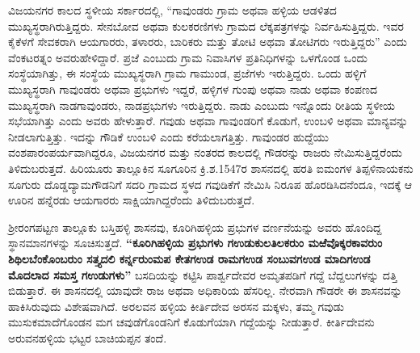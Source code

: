 ವಿಜಯನಗರ ಕಾಲದ ಸ್ಥಳೀಯ ಸರ್ಕಾರದಲ್ಲಿ, “ಗಾವುಂಡರು ಗ್ರಾಮ ಅಥವಾ ಹಳ್ಳಿಯ ಆಡಳಿತದ ಮುಖ್ಯಸ್ಥರಾಗಿರು\-ತ್ತಿದ್ದರು. ಸೇನಬೋವ ಅಥವಾ ಕುಲಕರಣಿಗಳು ಗ್ರಾಮದ ಲೆಕ್ಕಪತ್ರಗಳನ್ನು ನಿರ್ವಹಿಸುತ್ತಿದ್ದರು. ಇವರ ಕೈಕೆಳಗೆ ಸೇವಕರಾಗಿ ಆಯಗಾರರು, ತಳಾರರು, ಬಾರಿಕರು ಮತ್ತು ತೋಟಿ ಅಥವಾ ತೋಟಿಗರು ಇರುತ್ತಿದ್ದರು” ಎಂದು ವೆಂಕಟರತ್ನಂ ಅವರುಹೇಳಿದ್ದಾರೆ. ಪ್ರಜೆ ಎಂಬುದು ಗ್ರಾಮ ನಿವಾಸಿಗಳ ಪ್ರತಿನಿಧಿಗಳನ್ನು ಒಳಗೊಂಡ ಒಂದು ಸಂಸ್ಥೆಯಾಗಿತ್ತು, ಈ ಸಂಸ್ಥೆಯ ಮುಖ್ಯಸ್ಥರಾಗಿ ಗ್ರಾಮ ಗಾಮುಂಡ, ಪ್ರಜೆಗಳು ಇರುತ್ತಿದ್ದರು. ಒಂದು ಹಳ್ಳಿಗೆ ಮುಖ್ಯಸ್ಥರಾಗಿ ಗಾವುಂಡರು ಅಥವಾ ಪ್ರಭುಗಳು ಇದ್ದರೆ, ಹಳ್ಳಿಗಳ ಗುಂಪು ಅಥವಾ ನಾಡು ಅಥವಾ ಕಂಪಣದ ಮುಖ್ಯಸ್ಥರಾಗಿ ನಾಡಗಾವುಂಡರು, ನಾಡಪ್ರಭುಗಳು ಇರುತ್ತಿದ್ದರು. ನಾಡು ಎಂಬುದು ಇನ್ನೊಂದು ರೀತಿಯ ಸ್ಥಳೀಯ ಸಭೆಯಾಗಿತ್ತು ಎಂದು ಅವರು ಹೇಳುತ್ತಾರೆ. ಗವುಡು ಅಥವಾ ಗಾವುಂಡರಿಗೆ ಕೊಡುಗೆ, ಉಂಬಳಿ ಅಥವಾ ಮಾನ್ಯವನ್ನು ನೀಡಲಾಗುತ್ತಿತ್ತು. ಇದನ್ನು ಗೌಡಿಕೆ ಉಂಬಳಿ ಎಂದು ಕರೆಯಲಾಗತ್ತಿತ್ತು. ಗಾವುಂಡರ ಹುದ್ದೆಯು ವಂಶಪಾರಂಪರ್ಯವಾಗಿದ್ದರೂ, ವಿಜಯನಗರ ಮತ್ತು ನಂತರದ ಕಾಲದಲ್ಲಿ ಗೌಡರನ್ನು ರಾಜರು ನೇಮಿಸುತ್ತಿದ್ದರೆಂದು ತಿಳಿದುಬರುತ್ತದೆ. ಹಿರಿಯೂರು ತಾಲ್ಲೂಕಿನ ಸೂಗೂರಿನ ಕ್ರಿ.ಶ.1547ರ ಶಾಸನದಲ್ಲಿ ಹರತಿ ಐಮಂಗಳ ತಿಪ್ಪಳಿನಾಯಕನು ಸೂಗುರು ದೊಡ್ಡದ್ಯಾಮಗೌಡನಿಗೆ ಸದರಿ ಗ್ರಾಮದ ಸ್ಥಳದ ಗವುಡಿಕೆಗೆ ನೇಮಿಸಿ ನಿರೂಪ ಹೊರಡಿಸಿದನೆಂದೂ, ಇದಕ್ಕೆ ಆ ಊರಿನ ಹನ್ನೆರಡು ಆಯಗಾರರು ಸಾಕ್ಷಿಯಾಗಿದ್ದರೆಂದು ತಿಳಿದುಬರುತ್ತದೆ.

\newpage

ಶ‍್ರೀರಂಗಪಟ್ಟಣ ತಾಲ್ಲೂಕು ಬಸ್ತಿಹಳ್ಳಿ ಶಾಸನವು, ಕೂರಿಗಿಹಳ್ಳಿಯ ಪ್ರಭುಗಳ ವರ್ಣನೆಯನ್ನು ಅವರು ಹೊಂದಿದ್ದ ಸ್ಥಾನಮಾನ\-ಗಳನ್ನು ಸೂಚಿಸುತ್ತದೆ. \textbf{“ಕೂರಿಗಿಹಳ್ಳಿಯ ಪ್ರಭುಗಳು ಗಉಡುಕುಲತಿಲಕರುಂ ಮಱೆವೊಕ್ಕರಕಾವರುಂ ಶಿಥಿಲ\-ಬೆಂಕೊಂಬರುಂ ಸತ್ತ್ಯದಲಿ ಕರ್ನ್ನರುಂಮಪ ಕೇತಗಉಡ ರಾಮಗಉಡ ಸಂಬುವಗಉಡ ಮಾದಿಗಉಡ ಮೊದಲಾದ ಸಮಸ್ತ ಗಉಡುಗಳು”} ಬಸದಿಯನ್ನು ಕಟ್ಟಿಸಿ ಪಾರ್ಶ್ವದೇವರ ಅಮೃತಪಡಿಗೆ ಗದ್ದೆ ಬೆದ್ದಲುಗಳನ್ನು ದತ್ತಿ ಬಿಡುತ್ತಾರೆ. ಈ ಶಾಸನದಲ್ಲಿ ಯಾವುದೇ ರಾಜ ಅಥವಾ ಅಧಿಕಾರಿಯ ಹೆಸರಿಲ್ಲ. ನೇರವಾಗಿ ಗೌಡರೇ ಈ ಶಾಸನವನ್ನು ಹಾಕಿಸಿರುವುದು ವಿಶೇಷವಾಗಿದೆ. ಅರಲವನ ಹಳ್ಳಿಯ ಕೀರ್ತಿದೇವ ಅರಸನ ಮಕ್ಕಳು, ತಮ್ಮ ಗವುಡು ಮುಸುಕಮಾದೆಗೊಂಡನ ಮಗ ಚವುಡೆಗೊಂಡನಿಗೆ ಕೊಡುಗೆಯಾಗಿ ಗದ್ದೆಯನ್ನು ನೀಡುತ್ತಾರೆ. ಕೀರ್ತಿದೇವನು ಅರುವನಹಳ್ಳಿಯ ಭಟ್ಟರ ಬಾಚಿಯಪ್ಪನ ತಂದೆ.

